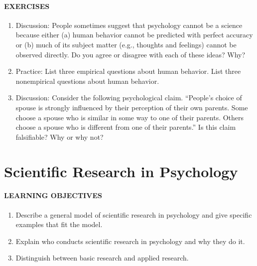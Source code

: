 \documentclass[
]{krantz}
\providecommand{\tightlist}{%
  \setlength{\itemsep}{0pt}\setlength{\parskip}{0pt}}
\begin{document}
\hypertarget{exercises}{%
\paragraph*{EXERCISES}\label{exercises}}

\begin{enumerate}
\def\labelenumi{\arabic{enumi}.}
\item
  Discussion: People sometimes suggest that psychology cannot be a science because either (a) human behavior cannot be predicted with perfect accuracy or (b) much of its subject matter (e.g., thoughts and feelings) cannot be observed directly. Do you agree or disagree with each of these ideas? Why?
\item
  Practice: List three empirical questions about human behavior. List three nonempirical questions about human behavior.
\item
  Discussion: Consider the following psychological claim. ``People's choice of spouse is strongly influenced by their perception of their own parents. Some choose a spouse who is similar in some way to one of their parents. Others choose a spouse who is different from one of their parents.'' Is this claim falsifiable? Why or why not?
\end{enumerate}

\hypertarget{scientific-research-in-psychology}{%
\section{Scientific Research in Psychology}\label{scientific-research-in-psychology}}

\hypertarget{learning-objectives-1}{%
\paragraph*{LEARNING OBJECTIVES}\label{learning-objectives-1}}

\begin{enumerate}
\def\labelenumi{\arabic{enumi}.}
\tightlist
\item
  Describe a general model of scientific research in psychology and give specific examples that fit the model.
\item
  Explain who conducts scientific research in psychology and why they do it.
\item
  Distinguish between basic research and applied research.
\end{enumerate}
\end{document}
